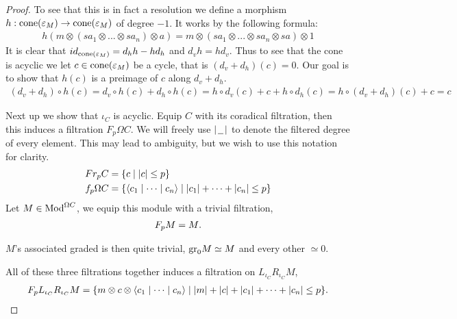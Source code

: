 \documentclass[../thesis.tex]{subfiles}
\begin{document}
\begin{proof}
                To see that this is in fact a resolution we define a morphism $h : \tt{cone}(\varepsilon_M) \rightarrow \tt{cone}(\varepsilon_M)$ of degree $-1$. It works by the following formula:
                \begin{align*}
                    h(m \otimes (sa_1 \otimes ... \otimes sa_n) \otimes a) = m \otimes (sa_1 \otimes ... \otimes sa_n \otimes sa) \otimes 1
                \end{align*}
                It is clear that $id_{\tt{cone}(\varepsilon_M)} = d_hh - hd_h$ and $d_vh = hd_v$. Thus to see that the cone is acyclic we let $c\in \tt{cone}(\varepsilon_M)$ be a cycle, that is $(d_v + d_h)(c) = 0$. Our goal is to show that $h(c)$ is a preimage of $c$ along $d_v + d_h$.
                \begin{multline*}
                    (d_v + d_h)\circ h(c) = d_v\circ h(c) + d_h\circ h(c) = h\circ d_v(c) + c + h\circ d_h(c) = h\circ (d_v + d_h)(c) + c = c
                \end{multline*}

                Next up we show that $\iota_C$ is acyclic. Equip $C$ with its coradical filtration, then this induces a filtration $F_p\Omega C$. We will freely use $|\argument |$ to denote the filtered degree of every element. This may lead to ambiguity, but we wish to use this notation for clarity.
                \begin{align*}
                    Fr_pC & = \startset{c \mid |c| \leq p} \\
                    f_p\Omega C & = \startset{\langle c_1 \mid \cdots \mid c_n \rangle \mid |c_1| + \cdots + |c_n| \leq p }
                \end{align*}
                Let $M \in \tt{Mod}^{\Omega C}$, we equip this module with a trivial filtration,
                \begin{align*}
                    F_pM = M\tt{.}
                \end{align*}

                $M$'s associated graded is then quite trivial, $\tt{gr}_0M \simeq M$ and every other $\simeq 0$.

                All of these three filtrations together induces a filtration on $L_{\iota_C}R_{\iota_C}M$,
                \begin{align*}
                    F_pL_{\iota_C}R_{\iota_C}M = \startset{m \otimes c \otimes \langle c_1 \mid \cdots \mid c_n \rangle \mid |m| + |c| + |c_1| + \cdots + |c_n| \leq p}\tt{.}
                \end{align*}


\end{proof}
\end{document}
